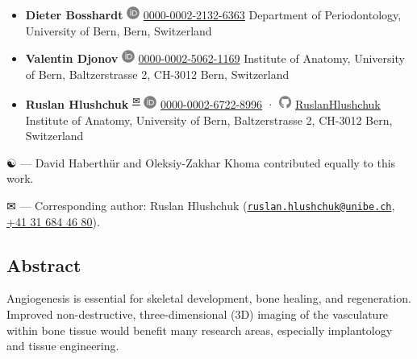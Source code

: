 \begin{itemize}
\item
  \textbf{Dieter Bosshardt}
  \includegraphics[width=0.16667in,height=0.16667in]{images/orcid.svg}
  \href{https://orcid.org/0000-0002-2132-6363}{0000-0002-2132-6363}
  Department of Periodontology, University of Bern, Bern, Switzerland
\item
  \textbf{Valentin Djonov}
  \includegraphics[width=0.16667in,height=0.16667in]{images/orcid.svg}
  \href{https://orcid.org/0000-0002-5062-1169}{0000-0002-5062-1169}
  Institute of Anatomy, University of Bern, Baltzerstrasse 2, CH-3012 Bern, Switzerland
\item
  \textbf{Ruslan Hlushchuk}
  \textsuperscript{\protect\hyperlink{correspondence}{✉}}
  \includegraphics[width=0.16667in,height=0.16667in]{images/orcid.svg}
  \href{https://orcid.org/0000-0002-6722-8996}{0000-0002-6722-8996}
  · \includegraphics[width=0.16667in,height=0.16667in]{images/github.svg}
  \href{https://github.com/RuslanHlushchuk}{RuslanHlushchuk}
  Institute of Anatomy, University of Bern, Baltzerstrasse 2, CH-3012 Bern, Switzerland
\end{itemize}

\leavevmode{}%
☯ --- David Haberthür and
Oleksiy-Zakhar Khoma contributed equally to this work.

\leavevmode{}%
✉ --- Corresponding author: Ruslan Hlushchuk (\href{mailto:ruslan.hlushchuk@unibe.ch}{\nolinkurl{ruslan.hlushchuk@unibe.ch}}, \href{tel:+41\%2031\%20684\%2046\%2080}{+41 31 684 46 80}).

\hypertarget{abstract}{%
\subsection{Abstract}\label{abstract}}

Angiogenesis is essential for skeletal development, bone healing, and regeneration.
Improved non-destructive, three-dimensional (3D) imaging of the vasculature within bone tissue would benefit many research areas, especially implantology and tissue engineering.

